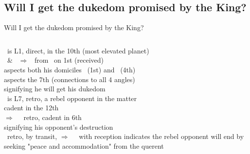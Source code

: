\subsection{Will I get the dukedom promised by the King?}
\begin{frame}[t]{Will I get the dukedom promised by the King?}
\begin{columns}[T, onlytextwidth]
\Jupiter\ is L1, direct, in the 10th (most elevated planet) \\
\hspace{1em}\Sun\ \& \Venus\ $\Rightarrow$ \Square\ from \Sagittarius\ on 1st (received) \\
\hspace{1em}aspects both his domiciles \Sagittarius\ (1st) and \Pisces\ (4th) \\
\hspace{1em}aspects the 7th (connections to all 4 angles) \\
\hspace{1em}signifying he will get his dukedom\\
\vspace{0.5em}
\Mercury\ is L7, retro, a rebel opponent in the matter \\
\hspace{1em}cadent in the 12th \\
\hspace{1em}$\Rightarrow$ \Opposition\ \Saturn\ retro, cadent in 6th\footnotemark[1] \\
\hspace{1em}signifying his opponent's destruction \\
\vspace{0.5em}
\Mercury\ retro, by transit, $\Rightarrow$ \Sextile\ \Jupiter\ with reception indicates the rebel opponent will end by seeking "peace and accommodation" from the querent


\end{columns}
\end{frame}
